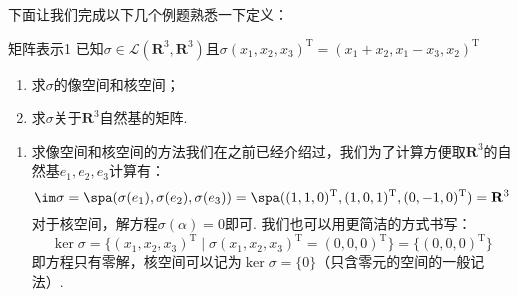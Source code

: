 下面让我们完成以下几个例题熟悉一下定义：
\begin{example}{}{矩阵表示1}
    已知$\sigma \in \mathcal{L}(\mathbf{R}^3,\mathbf{R}^3)$且$\sigma(x_1,x_2,x_3)^{\mathrm{T}}=(x_1+x_2,x_1-x_3, x_2)^{\mathrm{T}}$
    \begin{enumerate}
        \item 求$\sigma$的像空间和核空间；

        \item 求$\sigma$关于$\mathbf{R}^3$自然基的矩阵.
    \end{enumerate}
\end{example}

\begin{solution}
    \begin{enumerate}
        \item 求像空间和核空间的方法我们在之前已经介绍过，我们为了计算方便取$\mathbf{R}^3$的自然基$e_1,e_2,e_3$计算有：
              \[
                \im\sigma
                =\spa(\sigma(e_1),\sigma(e_2),\sigma(e_3))
                =\spa(
                        (1,1,0)^{\mathrm{T}},
                        (1,0,1)^{\mathrm{T}},
                        (0,-1,0)^{\mathrm{T}}
                    )
                =\mathbf{R}^3
              \]
              对于核空间，解方程$\sigma(\alpha)=0$即可. 我们也可以用更简洁的方式书写：
              \[
                \ker\sigma
                =\{
                    (x_1,x_2,x_3)^{\mathrm{T}} \mid
                    \sigma(x_1,x_2,x_3)^{\mathrm{T}}
                    =(0,0,0)^{\mathrm{T}}
                \}
                =\{(0,0,0)^{\mathrm{T}}\}
              \]
              即方程只有零解，核空间可以记为$\ker\sigma=\{0\}$（只含零元的空间的一般记法）.


\end{enumerate}
\end{solution}
